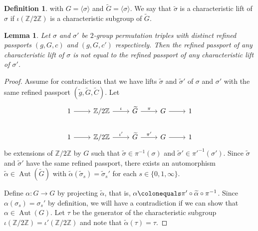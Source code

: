 \documentclass{dcthesis}
\newcommand{\ZZ}{\mathbb Z}
\newcommand{\defi}[1]{\textsf{#1}}
\newcommand{\wt}[1]{\widetilde{#1}}
\DeclareMathOperator{\Aut}{Aut}
\numberwithin{equation}{section}
\newtheorem{lemma}[equation]{Lemma}
\theoremstyle{definition}
\newtheorem{definition}[equation]{Definition}
\theoremstyle{remark}
\begin{document}
{{{\begin{definition}
      with $G=\langle\sigma\rangle$
      and $\wt{G}=\langle\sigma\rangle$.
      We say that $\wt{\sigma}$
      is a
      \defi{characteristic lift}
      of $\sigma$ if $\iota(\ZZ/2\ZZ)$
      is a characteristic subgroup
      of $\wt{G}$.
    \end{definition}
    \begin{lemma}
      \label{lem:identifiedinlift}
      Let $\sigma$ and $\sigma'$
      be $2$-group permutation triples
      with distinct refined passports
      $(g,G,c)$ and $(g,G,c')$ respectively.
      Then the refined passport of any
      characteristic lift
      of $\sigma$ is not equal to the refined
      passport of any
      characteristic lift of $\sigma'$.
    \end{lemma}
    \begin{proof}
      Assume for contradiction that we have
      lifts
      $\wt{\sigma}$ and $\wt{\sigma}'$
      of $\sigma$ and $\sigma'$
      with the same refined passport
      $(\wt{g},\wt{G},\wt{C})$.
      Let
      \begin{equation}
        \label{eqn:twoextensionsrefinedlemma}
        \begin{tikzcd}
          1\arrow{r}&\ZZ/2\ZZ\arrow{r}{\iota}
                    &\wt{G}\arrow{r}{\pi}
                    &G\arrow{r}&1\\
          1\arrow{r}&\ZZ/2\ZZ\arrow{r}{\iota'}
                    &\wt{G}\arrow{r}{\pi'}
                    &G\arrow{r}&1
        \end{tikzcd}
      \end{equation}
      be extensions of $\ZZ/2\ZZ$ by $G$
      such that $\wt{\sigma}\in\pi^{-1}(\sigma)$
      and $\wt{\sigma}'\in\pi'^{-1}(\sigma')$.
      Since $\wt{\sigma}$ and $\wt{\sigma}'$
      have the same refined passport,
      there exists
      an automorphism
      $\wt{\alpha}\in\Aut(\wt{G})$
      with
      $\wt{\alpha}(\wt{\sigma}_s) =
      \wt{\sigma}_s'$
      for each $s\in \{0,1,\infty\}$.
      \par
      Define $\alpha\colon G\to G$ by
      projecting $\wt{\alpha}$,
      that is,
      $\alpha\colonequals
      \pi'\circ\wt{\alpha}\circ\pi^{-1}$.
      Since $\alpha(\sigma_s)=\sigma_s'$
      by definition,
      we will have a contradiction if we can
      show that $\alpha\in\Aut(G)$.
      Let $\tau$
      be the generator of the characteristic
      subgroup
      $\iota(\ZZ/2\ZZ)=\iota'(\ZZ/2\ZZ)$
      and note that
      $\wt{\alpha}(\tau) = \tau$.
      \par

\end{proof}}}}
\end{document}
